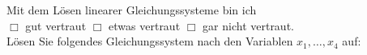 \documentclass[12pt,answers]{exam}
\begin{document}
\begin{questions}
\begin{solution}
\end{solution}

\pagebreak
{}

Mit dem Lösen linearer Gleichungssysteme bin ich \\ $\Box$ gut vertraut \hfill $\Box$ etwas vertraut \hfill $\Box$ gar nicht vertraut. \\[2ex]
L\"osen Sie folgendes Gleichungssystem nach den Variablen $x_1,\ldots,x_4$
auf:


\end{questions}
\end{document}
